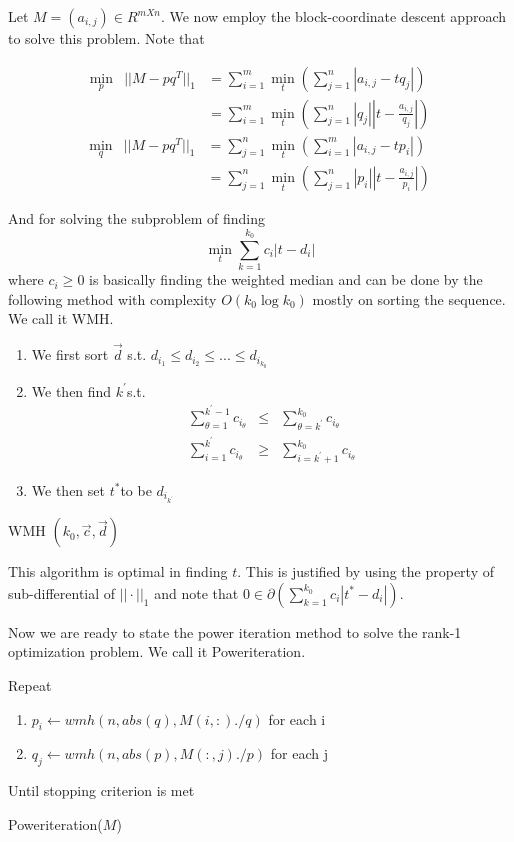 Let $M=(a_{i,j})\in R^{mXn}$. We now employ the block-coordinate
descent approach to solve this problem. Note that

\begin{eqnarray}
\min_{p} & ||M-pq^{T}||_{1} & =\sum_{i=1}^{m}\min_{t}(\sum_{j=1}^{n}|a_{i,j}-tq_{j}|)\\
 &  & =\sum_{i=1}^{m}\min_{t}(\sum_{j=1}^{n}|q_{j}||t-\frac{a_{i,j}}{q_{j}}|)\nonumber
\end{eqnarray}
\begin{eqnarray}
\min_{q} & ||M-pq^{T}||_{1} & =\sum_{j=1}^{n}\min_{t}(\sum_{i=1}^{m}|a_{i,j}-tp_{i}|)\\
 &  & =\sum_{j=1}^{n}\min_{t}(\sum_{j=1}^{n}|p_{i}||t-\frac{a_{i,j}}{p_{i}}|)\nonumber
\end{eqnarray}


And for solving the subproblem of finding
\[
\min_{t}\sum_{k=1}^{k_{0}}c_{i}|t-d_{i}|
\]
where $c_{i}\ge0$ is basically finding the weighted median and can
be done by the following method with complexity $O(k_{0}\log k_{0})$
mostly on sorting the sequence. We call it WMH.

\begin{algorithm}[h]
\begin{enumerate}
\item We first sort $\vec{\ensuremath{d}}$ s.t. $d_{i_{1}}\le d_{i_{2}}\le...\le d_{i_{k_{0}}}$
\item We then find $k^{'}$s.t.
\begin{eqnarray*}
\sum_{\theta=1}^{k^{'}-1}c_{i_{\theta}} & \le & \sum_{\theta=k^{'}}^{k_{0}}c_{i_{\theta}}\\
\sum_{i=1}^{k^{'}}c_{i_{\theta}} & \ge & \sum_{i=k^{'}+1}^{k_{0}}c_{i_{\theta}}
\end{eqnarray*}

\item We then set $t^{*}$to be $d_{i_{k^{'}}}$
\end{enumerate}
\caption{WMH $(k_{0},\vec{c},\vec{d})$}
\end{algorithm}


This algorithm is optimal in finding $t$. This is justified by using
the property of sub-differential of $||\cdot||_{1}$ and note that
$0\in\partial(\sum_{k=1}^{k_{0}}c_{i}|t^{*}-d_{i}|)$.

Now we are ready to state the power iteration method to solve the
rank-1 optimization problem. We call it Poweriteration.

\begin{algorithm}[h]
Repeat
\begin{enumerate}
\item $p_{i}\leftarrow wmh(n,abs(q),M(i,:)./q)$ for each i
\item $q_{j}\leftarrow wmh(n,abs(p),M(:,j)./p)$ for each j
\end{enumerate}
Until stopping criterion is met

\caption{Poweriteration($M$)}
\end{algorithm}



